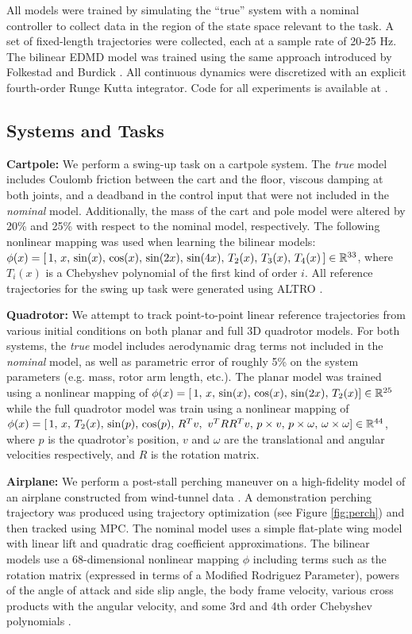 \documentclass{article}
\begin{document}
All models were trained by simulating the ``true'' system with a nominal controller to 
collect data in the region of the state space relevant to the task. A set of fixed-length 
trajectories were collected, each at a sample rate of 20-25 Hz. The bilinear EDMD model was
trained using the same approach introduced by Folkestad and Burdick \cite{Folkestad2021}.
All continuous dynamics were discretized with an explicit fourth-order Runge Kutta
integrator. Code for all experiments is available at .  

\subsection{Systems and Tasks}

\textbf{Cartpole:} We perform a swing-up task on a cartpole system. The \textit{true} model
includes Coulomb friction between the cart and the floor, viscous damping at both joints,
and a deadband in the control input that were not included in the \textit{nominal} model.
Additionally, the mass of the cart and pole model were altered by 20\% and 25\% with respect
to the nominal model, respectively.  The following nonlinear mapping was used when learning
the bilinear models: 
$\phi(x) = [\, 1,\,
x,\, \sin(x),\, \cos(x),\, \sin(2x),\, \sin(4x),\, T_2(x),\, T_3(x),\, T_4(x)\, ] \in
\mathbb{R}^{33}$, where $T_i(x)$ is a Chebyshev polynomial of the first kind of order $i$. 
All reference trajectories for the swing up task were generated using ALTRO 
\cite{Howell2019,Jackson2021}.

\textbf{Quadrotor:} We attempt to track point-to-point linear reference trajectories from
various initial conditions on both planar and full 3D quadrotor models. For both systems,
the \textit{true} model includes aerodynamic drag terms not included in the \textit{nominal}
model, as well as parametric error of roughly 5\% on the system parameters (e.g. mass, rotor
arm length, etc.). The planar model was trained using a nonlinear mapping of $\phi(x) = [\,
1,\, x,\, \sin(x),\, \cos(x),\, \sin(2x),\, T_2(x) ] \in \mathbb{R}^{25}$ while the full quadrotor
model was train using a nonlinear mapping of $\phi(x) = [\, 1,\, x,\, T_2(x),\, \sin(p),\,
\cos(p),\, R^{T}v,\ v^{T}RR^{T}v,\, p \times v,\, p \times \omega,\, \omega \times \omega ]
\in \mathbb{R}^{44}$, where $p$ is the quadrotor's position, $v$ and $\omega$ are the translational
and angular velocities respectively, and $R$ is the rotation matrix.

\textbf{Airplane:} We perform a post-stall perching maneuver on a high-fidelity model of an
airplane constructed from wind-tunnel data \cite{Manchester2017}. A demonstration perching
trajectory was produced using trajectory optimization (see Figure \ref{fig:perch}) and then
tracked using MPC. The nominal model uses a simple flat-plate wing model with linear lift
and quadratic drag coefficient approximations. The bilinear models use a 68-dimensional
nonlinear mapping $\phi$ including terms such as the rotation matrix (expressed in terms of
a Modified Rodriguez Parameter), powers of the angle of attack and side slip angle, the body
frame velocity, various cross products with the angular velocity, and some 3rd and 4th order
Chebyshev polynomials .
\end{document}
